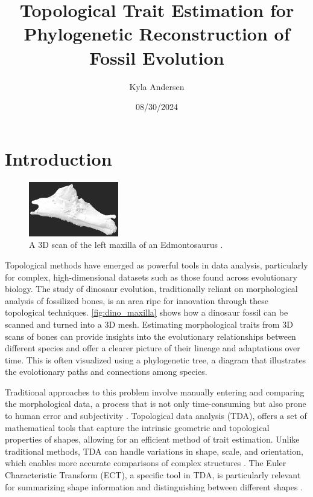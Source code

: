 \documentclass[12pt]{article}
\begin{document}
\title{Topological Trait Estimation for Phylogenetic Reconstruction of Fossil
Evolution}
\author{Kyla Andersen}
\date{08/30/2024}
\maketitle

\doublespacing

\section{Introduction}
\begin{figure}
	\centering
	\vspace{-12pt}
	\includegraphics[width=0.35\textwidth]{newDinoBone.png}
	\caption{A  3D scan of the left maxilla of an Edmontosaurus \citep{organ2024}.}
	\label{fig:dino_maxilla}
\end{figure}
\vspace{-15pt}

Topological methods have emerged as powerful tools in data analysis,
particularly for complex, high-dimensional datasets such as those found across
evolutionary biology. The study of dinosaur evolution, traditionally reliant on
morphological analysis of fossilized bones, is an area ripe for innovation
through these topological techniques. \autoref{fig:dino_maxilla} shows how a 
dinosaur fossil can be scanned and turned into a 3D mesh. Estimating 
morphological traits from 3D scans of bones can provide insights into the 
evolutionary relationships between different species and offer a clearer picture 
of their lineage and adaptations over time. This is often visualized using a
phylogenetic tree, a diagram that illustrates the evolotionary paths and
connections among species.

Traditional approaches to this problem involve manually entering and comparing the 
morphological data, a process that is not only time-consuming but also prone to
human error and subjectivity \citep{bates2009}. Topological data analysis (TDA), 
offers a set of mathematical tools that capture the intrinsic geometric and 
topological properties of shapes, allowing for an efficient method of trait 
estimation. Unlike traditional methods, TDA can handle variations in shape, 
scale, and orientation, which enables more accurate comparisons of complex 
structures \citep{zomorodian2009}. The Euler Characteristic Transform (ECT), 
a specific tool in TDA, is particularly relevant for summarizing shape information 
and distinguishing between different shapes \citep{cisewski2023}.
\end{document}

